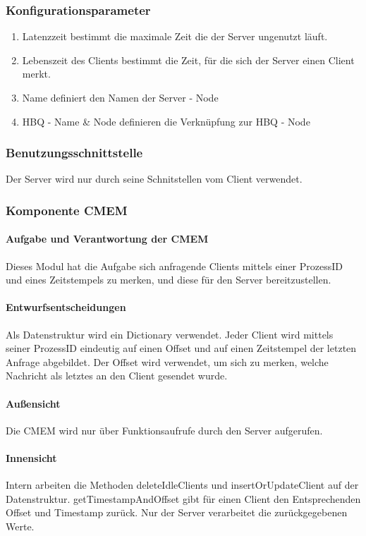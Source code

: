 \documentclass{article}
\begin{document}
		\subsubsection{Konfigurationsparameter}
			\begin{enumerate}
    			\item{Latenzzeit bestimmt die maximale Zeit die der Server ungenutzt läuft.}
    			\item{Lebenszeit des Clients bestimmt die Zeit, für die sich der Server einen 
    					Client merkt.}
    			\item{Name definiert den Namen der Server - Node}
    			\item{HBQ - Name & Node definieren die Verknüpfung zur HBQ - Node}
    		\end{enumerate}
		\subsubsection{Benutzungsschnittstelle}
			Der Server wird nur durch seine Schnitstellen vom Client verwendet.
		\subsubsection{Komponente CMEM}
			\paragraph{Aufgabe und Verantwortung der CMEM}
				Dieses Modul hat die Aufgabe sich anfragende Clients mittels einer ProzessID und eines Zeitstempels zu merken, und diese für den Server bereitzustellen.
			\paragraph{Entwurfsentscheidungen}
				Als Datenstruktur wird ein Dictionary verwendet. Jeder Client wird mittels
				seiner ProzessID eindeutig auf einen Offset und auf einen Zeitstempel der 
				letzten Anfrage abgebildet. Der Offset wird verwendet, um sich zu merken, 
				welche Nachricht als letztes an den Client gesendet wurde.
			\paragraph{Außensicht}
				Die CMEM wird nur über Funktionsaufrufe durch den Server aufgerufen.
			\paragraph{Innensicht}
				Intern arbeiten die Methoden deleteIdleClients und insertOrUpdateClient
				auf der Datenstruktur. getTimestampAndOffset gibt für einen Client den Entsprechenden
				Offset und Timestamp zurück. Nur der Server verarbeitet die zurückgegebenen Werte.
\end{document}
